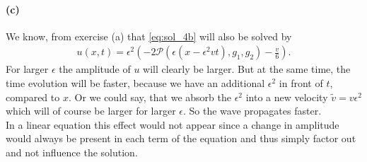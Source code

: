\paragraph{(c)}
We know, from exercise (a) that \cref{eq:sol_4b} will also be solved by
\begin{align}
u(x,t)=\epsilon^2\left(-2\mathscr{P}(\epsilon\left( x-\epsilon^2v t\right), g_1,g_2)-\frac{v}{6}\right).
\end{align}
For larger $\epsilon$ the amplitude of $u$ will clearly be larger. But at the same time, the time evolution will be faster, because we have an additional $\epsilon^2$ in front of $t$, compared to $x$. Or we could say, that we absorb the $\epsilon^2$ into a new velocity $\tilde{v}=v\epsilon^2$ which will of course be larger for larger $\epsilon$. So the wave propagates faster.\\
In a linear equation this effect would not appear since a change in amplitude would always be present in each term of the equation and thus simply factor out and not influence the solution. 
